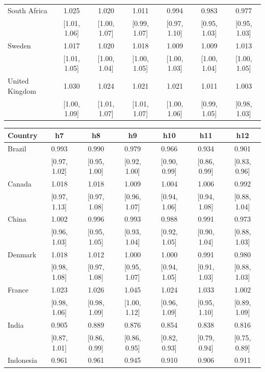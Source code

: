 \begin{table}[htbp]
{\begin{tabular*}{\textwidth}{@{\extracolsep{\fill}}lcccccc}
\addlinespace
South Africa & 1.025 & 1.020 & 1.011 & 0.994 & 0.983 & 0.977 \\
 & [1.01, 1.06] & [1.00, 1.07] & [0.99, 1.07] & [0.97, 1.10] & [0.95, 1.03] & [0.95, 1.03] \\
\addlinespace
Sweden & 1.017 & 1.020 & 1.018 & 1.009 & 1.009 & 1.013 \\
 & [1.01, 1.05] & [1.00, 1.04] & [1.00, 1.05] & [1.00, 1.03] & [1.00, 1.04] & [1.00, 1.05] \\
\addlinespace
United Kingdom & 1.030 & 1.024 & 1.021 & 1.021 & 1.011 & 1.003 \\
 & [1.00, 1.09] & [1.01, 1.07] & [1.01, 1.07] & [1.00, 1.06] & [0.99, 1.05] & [0.98, 1.03] \\
\bottomrule
\end{tabular*}

\vspace{6pt}
\begin{tabular*}{\textwidth}{@{\extracolsep{\fill}}lcccccc}
\toprule
Country & h7 & h8 & h9 & h10 & h11 & h12 \\
\midrule
Brazil & 0.993 & 0.990 & 0.979 & 0.966 & 0.934 & 0.901 \\
 & [0.97, 1.02] & [0.95, 1.00] & [0.92, 1.00] & [0.90, 0.99] & [0.86, 0.99] & [0.83, 0.96] \\
\addlinespace
Canada & 1.018 & 1.018 & 1.009 & 1.004 & 1.006 & 0.992 \\
 & [0.97, 1.13] & [0.97, 1.08] & [0.96, 1.07] & [0.94, 1.06] & [0.94, 1.08] & [0.88, 1.04] \\
\addlinespace
China & 1.002 & 0.996 & 0.993 & 0.988 & 0.991 & 0.973 \\
 & [0.96, 1.03] & [0.95, 1.05] & [0.93, 1.04] & [0.92, 1.05] & [0.90, 1.04] & [0.88, 1.03] \\
\addlinespace
Denmark & 1.018 & 1.012 & 1.000 & 1.000 & 0.991 & 0.980 \\
 & [0.98, 1.08] & [0.97, 1.08] & [0.95, 1.07] & [0.94, 1.05] & [0.91, 1.03] & [0.88, 1.03] \\
\addlinespace
France & 1.023 & 1.026 & 1.045 & 1.024 & 1.033 & 1.002 \\
 & [0.98, 1.06] & [0.98, 1.09] & [1.00, 1.12] & [0.96, 1.09] & [0.95, 1.10] & [0.89, 1.09] \\
\addlinespace
India & 0.905 & 0.889 & 0.876 & 0.854 & 0.838 & 0.816 \\
 & [0.87, 1.01] & [0.86, 0.99] & [0.86, 0.95] & [0.82, 0.93] & [0.79, 0.94] & [0.75, 0.89] \\
\addlinespace
Indonesia & 0.961 & 0.961 & 0.945 & 0.910 & 0.906 & 0.911 \\

\end{tabular*}}
\end{table}
